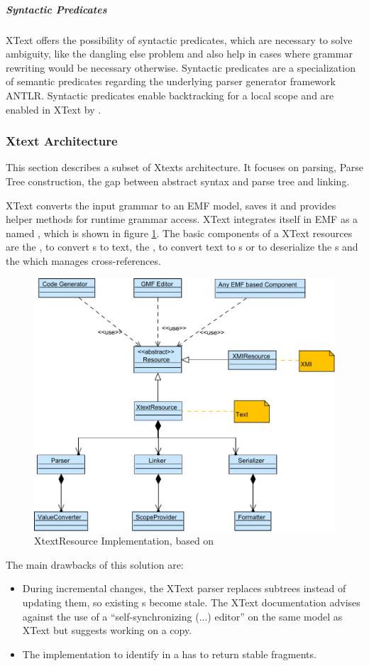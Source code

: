 \subparagraph{Syntactic Predicates}
XText offers the possibility of syntactic predicates, which are necessary to solve ambiguity, like the dangling else problem and also help in cases where grammar rewriting would be necessary otherwise. Syntactic predicates are a specialization of semantic predicates regarding the underlying parser generator framework ANTLR. Syntactic predicates enable backtracking for a local scope and are enabled in XText by \code{=>}.


\subsubsection{Xtext Architecture} \label{cha:xtextarch}
This section describes a subset of Xtexts architecture. It focuses on parsing, Parse Tree construction, the gap between abstract syntax and parse tree and linking.

XText converts the input grammar to an EMF model, saves it and provides helper methods for runtime grammar access. XText integrates itself in EMF as a  named , which is shown in figure \ref{XtextArch}.  The basic components of a XText resources are the , to convert s to text, the , to convert text to s or to deserialize the s and the  which manages cross-references. 

\begin{figure}
\centering
\includegraphics[scale=0.75]{gfx/ex/Xtext} 
\caption{XtextResource Implementation, based on \cite{XTextMan}}
\label{XtextArch}
\end{figure}
The main drawbacks of this solution are:
\begin{itemize}
	\item During incremental changes, the XText parser replaces subtrees instead of updating them, so existing s become stale. The XText documentation advises against the use of a ``self-synchronizing (...) editor'' on the same model as XText but suggests working on a copy.
	\item The implementation to identify  in a  has to return stable fragments.
\end{itemize}

